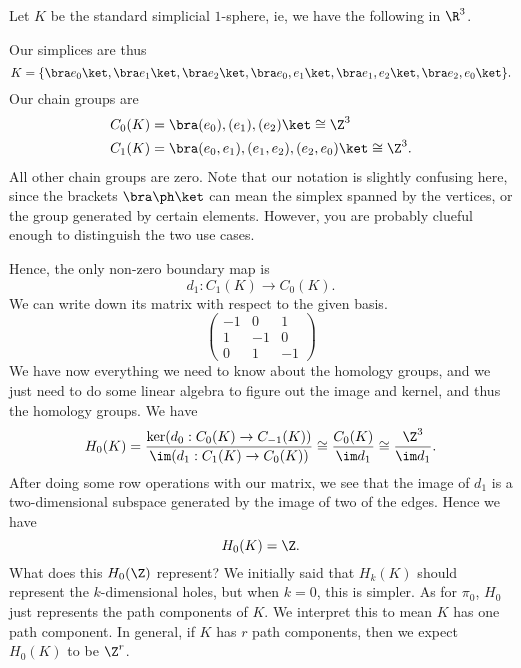 \documentclass[a4paper]{article}
\begin{document}
\begin{eg}
  Let $K$ be the standard simplicial $1$-sphere, ie, we have the following in $\R^3$.
  \begin{center}
  \end{center}
  Our simplices are thus
  \[
    K = \{\bra e_0\ket, \bra e_1\ket, \bra e_2\ket, \bra e_0, e_1\ket, \bra e_1, e_2\ket, \bra e_2, e_0\ket\}.
  \]
  Our chain groups are
  \begin{align*}
    C_0(K) &= \bra (e_0), (e_1), (e_2)\ket \cong \Z^3\\
    C_1(K) &= \bra (e_0, e_1), (e_1, e_2), (e_2, e_0)\ket \cong \Z^3.
  \end{align*}
  All other chain groups are zero. Note that our notation is slightly confusing here, since the brackets $\bra \ph \ket$ can mean the simplex spanned by the vertices, or the group generated by certain elements. However, you are probably clueful enough to distinguish the two use cases.

  Hence, the only non-zero boundary map is
  \[
    d_1: C_1(K) \to C_0(K).
  \]
  We can write down its matrix with respect to the given basis.
  \[
    \begin{pmatrix}
      -1 & 0 & 1\\
      1 & -1 & 0\\
      0 & 1 & -1
    \end{pmatrix}
  \]
  We have now everything we need to know about the homology groups, and we just need to do some linear algebra to figure out the image and kernel, and thus the homology groups. We have
  \[
    H_0(K) = \frac{\ker (d_0: C_0(K) \to C_{-1}(K))}{\im (d_1: C_1(K) \to C_0(K))} \cong \frac{C_0(K)}{\im d_1} \cong \frac{\Z^3}{\im d_1}.
  \]
  After doing some row operations with our matrix, we see that the image of $d_1$ is a two-dimensional subspace generated by the image of two of the edges. Hence we have
  \[
    H_0(K) = \Z.
  \]
  What does this $H_0(\Z)$ represent? We initially said that $H_k(K)$ should represent the $k$-dimensional holes, but when $k = 0$, this is simpler. As for $\pi_0$, $H_0$ just represents the path components of $K$. We interpret this to mean $K$ has one path component. In general, if $K$ has $r$ path components, then we expect $H_0(K)$ to be $\Z^r$.


\end{eg}
\end{document}

